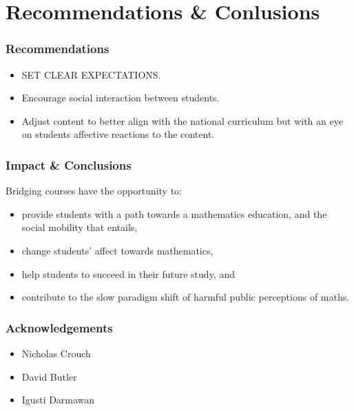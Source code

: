 \documentclass[14pt]{beamer}
\begin{document}
\section{Recommendations \& Conlusions}

\begin{frame}
\frametitle{Recommendations}
\begin{itemize}
	\item SET CLEAR EXPECTATIONS.
	\item Encourage social interaction between students.
	\item Adjust content to better align with the national curriculum but with an eye on students affective reactions to the content.
\end{itemize}
\end{frame}

\begin{frame}
\frametitle{Impact \& Conclusions}
Bridging courses have the opportunity to:
\begin{itemize}
	\item provide students with a path towards a mathematics education, and the social mobility that entails,
	\item change students' affect towards mathematics,
	\item help students to succeed in their future study, and
	\item contribute to the slow paradigm shift of harmful public perceptions of maths.
\end{itemize}
\end{frame}

\begin{frame}
\frametitle{Acknowledgements}
\begin{itemize}
	\item Nicholas Crouch
	\item David Butler
	\item Igusti Darmawan
\end{itemize}
\end{frame}
\end{document}
